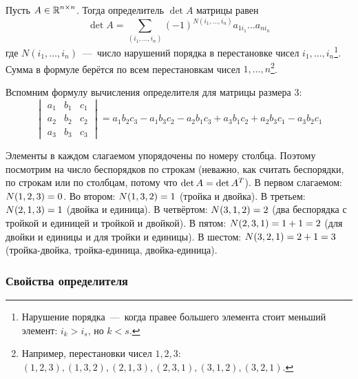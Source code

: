 \documentclass[a4paper,12pt]{article}
\begin{document}
  \begin{theorem}\label{theor:complete-expansion}
    Пусть $A \in \operatorname{\mathbb R}^{n \times n}$.
    Тогда определитель $\det A$ матрицы равен
    \begin{equation}
      \label{eq:complete-expansion}
      \det A = \sum_{(i_1, \ldots, i_n)} (-1)^{N(i_1, \ldots, i_n)} a_{1 i_1} \ldots a_{n i_n}
    \end{equation}
    где $N(i_1, \ldots, i_n)$~---~число нарушений порядка в перестановке чисел $i_1, \ldots, i_n$\footnote{Нарушение порядка~---~когда правее большего элемента стоит меньший элемент: $i_k > i_s$, но $k < s$.}.
    Сумма в формуле берётся по всем перестановкам чисел $1, \ldots, n$\footnote{Например, перестановки чисел $1, 2, 3$: $(1, 2, 3), (1, 3, 2), (2, 1, 3), (2, 3, 1), (3, 1, 2), (3, 2, 1)$.}.
  \end{theorem}
  
  \begin{example}
    Вспомним формулу вычисления определителя для матрицы размера $3$:
    \begin{equation*}
      \begin{vmatrix}
        a_1 & b_1 & c_1\\
        a_2 & b_2 & c_2\\
        a_3 & b_3 & c_3
      \end{vmatrix}
        = a_1 b_2 c_3 - a_1 b_3 c_2 - a_2 b_1 c_3 + a_3 b_1 c_2 + a_2 b_3 c_1 - a_3 b_2 c_1
    \end{equation*}
    
    Элементы в каждом слагаемом упорядочены по номеру столбца.
    Поэтому посмотрим на число беспорядков по строкам (неважно, как считать беспорядки, по строкам или по столбцам, потому что $\det A \hm= \det A^T$).
    В первом слагаемом: $N(1, 2, 3) \hm= 0$.
    Во втором: $N(1, 3, 2) \hm= 1$ (тройка и двойка).
    В третьем: $N(2, 1, 3) \hm= 1$ (двойка и единица).
    В четвёртом: $N(3, 1, 2) \hm= 2$ (два беспорядка с тройкой и единицей и тройкой и двойкой).
    В пятом: $N(2, 3, 1) \hm= 1 \hm+ 1 \hm= 2$ (для двойки и единицы и для тройки и единицы).
    В шестом: $N(3, 2, 1) \hm= 2 \hm+ 1 \hm= 3$ (тройка-двойка, тройка-единица, двойка-единица).
  \end{example}
  
  
  \subsubsection{Свойства определителя}
  
\end{document}
